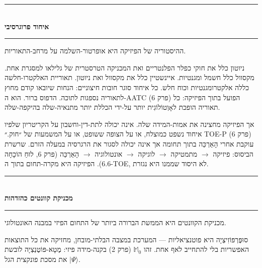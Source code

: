 \documentclass[10pt, openany, oneside]{book}
\renewcommand{\normalsize}{\fontsize{10}{13}\selectfont}
\begin{document}
\vspace{1.5em}


\begin{center}
    \rule{0.3\textwidth}{0.4pt}\\[0.5em]
    {\normalsize\bfseries\textsc{איחוד פרוגרסיבי}}\\[0.3em]
    \rule{0.3\textwidth}{0.4pt}
\end{center}

\vspace{1em}

\noindent ההיסטוריה של הפיזיקה היא אופרטור-השלמה על מרחב-התאוריות.

ניוטון כלל את חוקי כפלר הפלנטריים ואת המכניקה הטרסטרית של גלילאו למסגרת אחת. מקסוול כלל חשמל ומגנטיות. איינשטיין כלל את מקסוול ואת ניוטון. תאוריית האלקטרו-חלשה כללה אלקטרומגנטיות וכוח חלש. כל איחוד סוגר חובות חיצוניים: הנחות שיובאו קודם מחוץ לתאוריה נספגות לתוכה. הדפוס ברור. הוא ה-AATC (פרק 6) הפועל בתוך הפיזיקה: כל תאוריה הופכת לאָוְטוֹלוֹגִית יותר על-ידי הכללת יותר מתנאיה-שלה בהיקפה-שלה.

אך הפיזיקה מחצינה את אמות-המידה שלה. אינה יכולה לתת-דין-וחשבון על הקריטריון שלפיו איחוד נשפט כמוצלח, או על הצופה ששופט, או על המשמעות של ״חוק.״ TOE-P (פרק 6) עוקבת אחרי הָאַרְכֵּה בתוך תחומה אך אינה יכולה לסגור את הרגרסיה במעלה הזרם. שרשרת הביסוס: פיזיקה $\to$ מתמטיקה $\to$ לוגיקה $\to$ אונטולוגיה $\to$ הָאַרְכֵּה (פרק 6, לוּחַ הוֹכָחָה 6.6). הפיזיקה היא מקרה-תחום בתוך ה-TOE, לא היסוד שממנו היא נגזרת.

\vspace{1.5em}


\begin{center}
    \rule{0.3\textwidth}{0.4pt}\\[0.5em]
    {\normalsize\bfseries\textsc{מכניקת קוונטים כהזדהות}}\\[0.3em]
    \rule{0.3\textwidth}{0.4pt}
\end{center}

\vspace{1em}

\noindent מכניקת הקוונטים היא הממשת הברורה ביותר של התחום הפיזי במבנה האונטולוגי.

סוּפֶּרְפּוֹזִיצְיָה היא פוטנציאליות — המערכת במצבה הבלתי-מובחן, מחזיקה את כל התוצאות האפשריות בלי להתחייב לאף אחת. זהו $\mathbb{M}_0$ (פרק 2) בקנה-מידה פיזי: מֶטָא-פּוֹטֶנְצְיָה לובשת את מסכת פונקצית הגל $|\Psi\rangle$.
\end{document}
